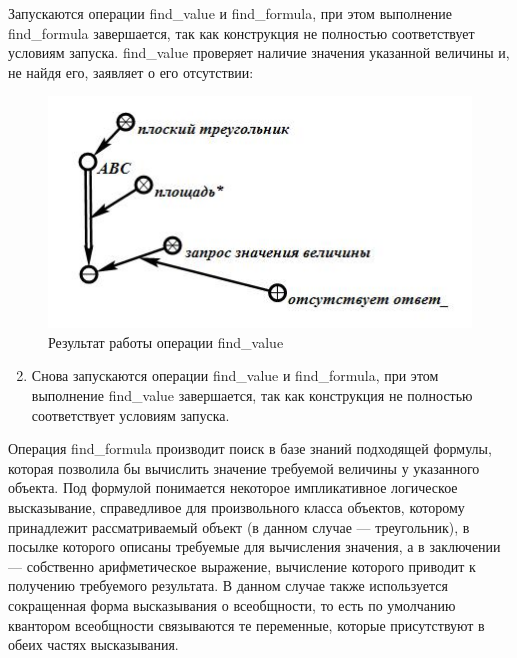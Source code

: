 Запускаются операции find\_value и find\_formula, при этом выполнение find\_formula завершается, так как конструкция не полностью соответствует условиям запуска. find\_value проверяет наличие значения указанной величины и, не найдя его, заявляет о его отсутствии:

\begin{figure}[H]
	\includegraphics[scale=0.5]{images/part7/chapter_learning_systems/step3.jpg}
	\caption{Результат работы операции find\_value}
	\label{fig:step3}
\end{figure}

\begin{enumerate}
	\setcounter{enumi}{1}
	\item
	Снова запускаются операции find\_value и find\_formula, при этом выполнение find\_value завершается, так как конструкция не полностью соответствует условиям запуска.
\end{enumerate}

Операция find\_formula производит поиск в базе знаний подходящей формулы, которая позволила бы вычислить значение требуемой величины у указанного объекта. Под формулой понимается некоторое импликативное логическое высказывание, справедливое для произвольного класса объектов, которому принадлежит рассматриваемый объект (в данном случае --- треугольник), в посылке которого описаны требуемые для вычисления значения, а в заключении --- собственно арифметическое выражение, вычисление которого приводит к получению требуемого результата. В данном случае также используется сокращенная форма высказывания о всеобщности, то есть по умолчанию квантором всеобщности связываются те переменные, которые присутствуют в обеих частях высказывания.

